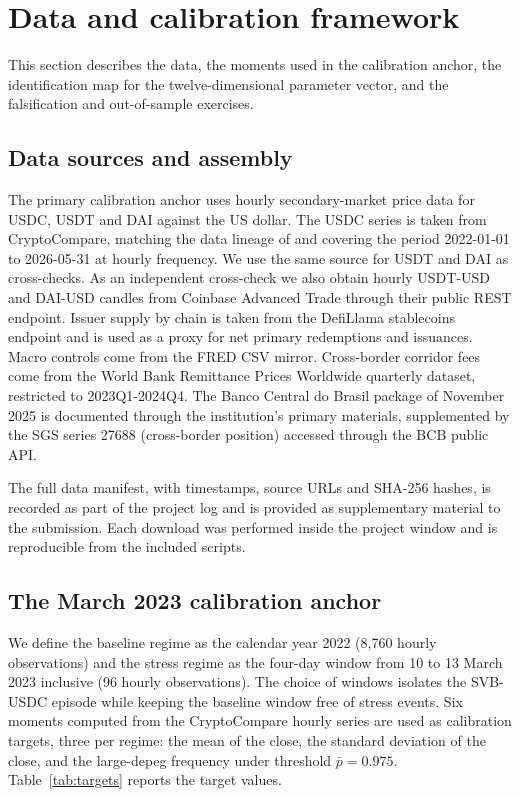 \section{Data and calibration framework}\label{sec:data_calibration}

This section describes the data, the moments used in the calibration anchor, the identification map for the twelve-dimensional parameter vector, and the falsification and out-of-sample exercises.

\subsection{Data sources and assembly}\label{sub:data}

The primary calibration anchor uses hourly secondary-market price data for USDC, USDT and DAI against the US dollar. The USDC series is taken from CryptoCompare, matching the data lineage of \citet{ahmed_aldasoro_duley_2025} and covering the period 2022-01-01 to 2026-05-31 at hourly frequency. We use the same source for USDT and DAI as cross-checks. As an independent cross-check we also obtain hourly USDT-USD and DAI-USD candles from Coinbase Advanced Trade through their public REST endpoint. Issuer supply by chain is taken from the DefiLlama stablecoins endpoint and is used as a proxy for net primary redemptions and issuances. Macro controls come from the FRED CSV mirror. Cross-border corridor fees come from the World Bank Remittance Prices Worldwide quarterly dataset, restricted to 2023Q1-2024Q4. The Banco Central do Brasil package of November 2025 is documented through the institution's primary materials, supplemented by the SGS series 27688 (cross-border position) accessed through the BCB public API.

The full data manifest, with timestamps, source URLs and SHA-256 hashes, is recorded as part of the project log and is provided as supplementary material to the submission. Each download was performed inside the project window and is reproducible from the included scripts.

\subsection{The March 2023 calibration anchor}\label{sub:anchor}

We define the baseline regime as the calendar year 2022 (8,760 hourly observations) and the stress regime as the four-day window from 10 to 13 March 2023 inclusive (96 hourly observations). The choice of windows isolates the SVB-USDC episode while keeping the baseline window free of stress events. Six moments computed from the CryptoCompare hourly series are used as calibration targets, three per regime: the mean of the close, the standard deviation of the close, and the large-depeg frequency under threshold $\bar{p} = 0.975$. Table~\ref{tab:targets} reports the target values.

